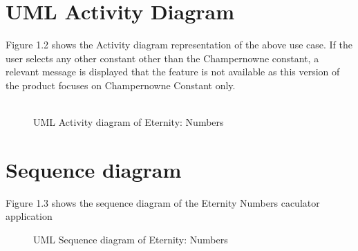 \documentclass[12pt, a4paper]{report}
\begin{document}
\section{UML Activity Diagram}
Figure 1.2 shows the Activity diagram representation of the above use case. If the user selects any other constant other than the Champernowne constant, a relevant message is displayed that the feature is not available as this version of the product focuses on Champernowne Constant only.\\\\
\begin{figure}[!h]
    \centering
    \caption{UML Activity diagram of Eternity: Numbers}
    \label{fig:UML Activity diagram of Eternity: Numbers}
\end{figure}

\section{Sequence diagram}
Figure 1.3 shows the sequence diagram of the Eternity Numbers caculator application
\begin{figure}[h]
    \centering
    \caption{UML Sequence diagram of Eternity: Numbers}
    \label{fig:UML Sequence diagram of Eternity: Numbers}
\end{figure}
\end{document}
